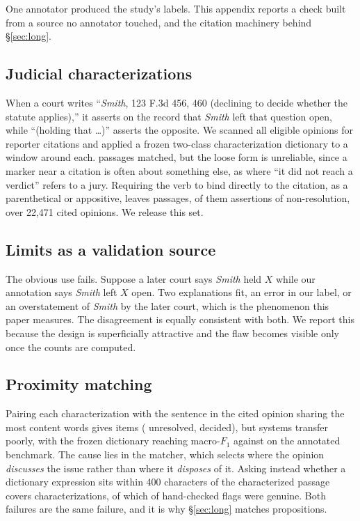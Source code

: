 One annotator produced the study's labels. This appendix reports a check built
from a source no annotator touched, and the citation machinery behind
\S\ref{sec:long}.

\subsection{Judicial characterizations} When a court writes ``\emph{Smith}, 123
F.3d 456, 460 (declining to decide whether the statute applies),'' it asserts on
the record that \emph{Smith} left that question open, while ``(holding that
\dots)'' asserts the opposite. We scanned all \NEligible{} eligible opinions for reporter
citations and applied a frozen two-class characterization dictionary to a window
around each. \NCharLoose{} passages matched, but the loose form is unreliable, since a
marker near a citation is often about something else, as where ``it did not reach
a verdict'' refers to a jury. Requiring the verb to bind directly to the citation,
as a parenthetical or appositive, leaves \NCharTight{} passages, \NCharLZero{} of them
assertions of non-resolution, over 22,471 cited opinions. We release this set.

\subsection{Limits as a validation source} The obvious use fails. Suppose a later
court says \emph{Smith} held $X$ while our annotation says \emph{Smith} left $X$
open. Two explanations fit, an error in our label, or an overstatement of
\emph{Smith} by the later court, which is the phenomenon this paper measures.
The disagreement is equally consistent with both. We report this because the design
is superficially attractive and the flaw becomes visible only once the counts are
computed.

\subsection{Proximity matching} Pairing each characterization with the sentence in
the cited opinion sharing the most content words gives \NJudgeBench{} items (\NJudgeUnres{}
unresolved, \NJudgeDec{} decided), but systems transfer poorly, with the frozen dictionary
reaching \JudgeLexF{} macro-$F_1$ against \LexF{} on the annotated benchmark. The
cause lies in the matcher, which selects where the opinion \emph{discusses} the
issue rather than where it \emph{disposes} of it.
Asking instead whether a dictionary expression sits within 400 characters of the
characterized passage covers \NEscN{} characterizations, of which \NProxyGood{} of \NProxyCheck{}
hand-checked flags were genuine. Both failures are the same failure, and it is why
\S\ref{sec:long} matches propositions.

